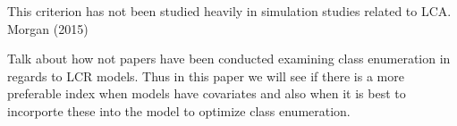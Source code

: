 This criterion has not been studied heavily in simulation studies related to LCA. Morgan (2015) 



\hspace{2em} Talk about how not papers have been conducted examining class enumeration in regards to LCR models. Thus in this paper we will see if there is a more preferable index when models have covariates and also when it is best to incorporte these into the model to optimize class enumeration. 

















